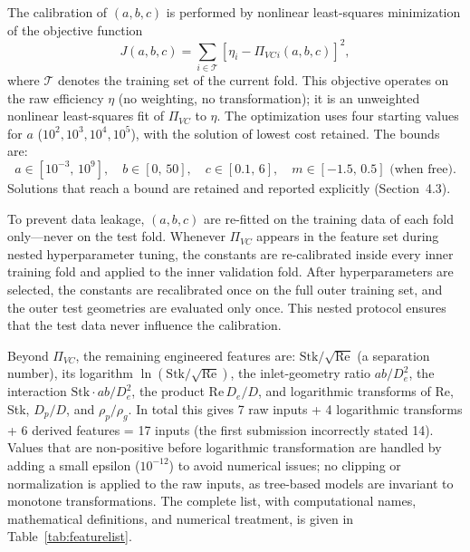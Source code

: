 \documentclass[12pt]{article}
\newcommand{\Stk}{\mathrm{Stk}}
\newcommand{\Rey}{\mathrm{Re}}
\newcommand{\PiVC}{\Pi_{VC}}
\begin{document}
The calibration of $(a, b, c)$ is performed by nonlinear least-squares minimization of the objective function
\begin{equation}
J(a, b, c) = \sum_{i \in \mathcal{T}} \left[\eta_i - \PiVC{}_i(a, b, c)\right]^2,
\label{eq:objective}
\end{equation}
where $\mathcal{T}$ denotes the training set of the current fold. This objective operates on the raw efficiency $\eta$ (no weighting, no transformation); it is an unweighted nonlinear least-squares fit of $\PiVC$ to $\eta$. The optimization uses four starting values for $a$ ($10^2, 10^3, 10^4, 10^5$), with the solution of lowest cost retained. The bounds are:
\begin{equation}
a \in [10^{-3},\, 10^9], \quad b \in [0,\, 50], \quad c \in [0.1,\, 6], \quad m \in [-1.5,\, 0.5] \text{ (when free)}.
\end{equation}
Solutions that reach a bound are retained and reported explicitly (Section~4.3).

To prevent data leakage, $(a, b, c)$ are re-fitted on the training data of each fold only---never on the test fold. Whenever $\PiVC$ appears in the feature set during nested hyperparameter tuning, the constants are re-calibrated inside every inner training fold and applied to the inner validation fold. After hyperparameters are selected, the constants are recalibrated once on the full outer training set, and the outer test geometries are evaluated only once. This nested protocol ensures that the test data never influence the calibration.

Beyond $\PiVC$, the remaining engineered features are: $\Stk/\sqrt{\Rey}$ (a separation number), its logarithm $\ln(\Stk/\sqrt{\Rey})$, the inlet-geometry ratio $ab/D_e^2$, the interaction $\Stk \cdot ab/D_e^2$, the product $\Rey\,D_e/D$, and logarithmic transforms of Re, Stk, $D_p/D$, and $\rho_p/\rho_g$. In total this gives 7 raw inputs + 4 logarithmic transforms + 6 derived features = 17 inputs (the first submission incorrectly stated 14). Values that are non-positive before logarithmic transformation are handled by adding a small epsilon ($10^{-12}$) to avoid numerical issues; no clipping or normalization is applied to the raw inputs, as tree-based models are invariant to monotone transformations. The complete list, with computational names, mathematical definitions, and numerical treatment, is given in Table~\ref{tab:featurelist}.
\end{document}
